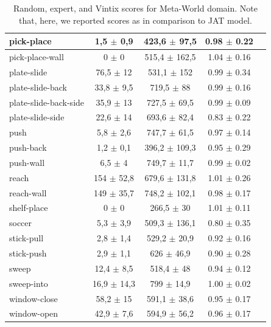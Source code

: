 \documentclass{article}
\theoremstyle{plain}
\theoremstyle{definition}
\theoremstyle{remark}
\begin{document}
\begin{table}[H]
{\begin{tabular}{|l|c|c|c|c|}
pick-place                & 1,5 $\pm$ 0,9     & 423,6 $\pm$ 97,5  &               0.98 $\pm$ 0.22     \\ \hline
pick-place-wall           & 0 $\pm$ 0         & 515,4 $\pm$ 162,5 &               1.04 $\pm$ 0.16     \\ \hline
plate-slide               & 76,5 $\pm$ 12     & 531,1 $\pm$ 152   &               0.99 $\pm$ 0.34     \\ \hline
plate-slide-back          & 33,8 $\pm$ 9,5    & 719,5 $\pm$ 88    &               0.99 $\pm$ 0.16     \\ \hline
plate-slide-back-side     & 35,9 $\pm$ 13     & 727,5 $\pm$ 69,5  &               0.99 $\pm$ 0.09     \\ \hline
plate-slide-side          & 22,6 $\pm$ 14     & 693,6 $\pm$ 82,4  &               0.83 $\pm$ 0.22     \\ \hline
push                      & 5,8 $\pm$ 2,6     & 747,7 $\pm$ 61,5  &               0.97 $\pm$ 0.14     \\ \hline
push-back                 & 1,2 $\pm$ 0,1     & 396,2 $\pm$ 109,3 &               0.95 $\pm$ 0.29     \\ \hline
push-wall                 & 6,5 $\pm$ 4       & 749,7 $\pm$ 11,7  &               0.99 $\pm$ 0.02     \\ \hline
reach                     & 154 $\pm$ 52,8    & 679,6 $\pm$ 131,8 &               1.01 $\pm$ 0.26     \\ \hline
reach-wall                & 149 $\pm$ 35,7    & 748,2 $\pm$ 102,1 &               0.98 $\pm$ 0.17     \\ \hline
shelf-place               & 0 $\pm$ 0         & 266,5 $\pm$ 30    &               1.01 $\pm$ 0.11     \\ \hline
soccer                    & 5,3 $\pm$ 3,9     & 509,3 $\pm$ 136,1 &               0.80 $\pm$ 0.35     \\ \hline
stick-pull                & 2,8 $\pm$ 1,4     & 529,2 $\pm$ 20,9  &               0.92 $\pm$ 0.16     \\ \hline
stick-push                & 2,9 $\pm$ 1,1     & 626 $\pm$ 46,9    &               0.90 $\pm$ 0.28     \\ \hline
sweep                     & 12,4 $\pm$ 8,5    & 518,4 $\pm$ 48    &               0.94 $\pm$ 0.12     \\ \hline
sweep-into                & 16,9 $\pm$ 14,3   & 799 $\pm$ 14,9    &               1.00 $\pm$ 0.02     \\ \hline
window-close              & 58,2 $\pm$ 15     & 591,1 $\pm$ 38,6  &               0.95 $\pm$ 0.17     \\ \hline
window-open               & 42,9 $\pm$ 7,6    & 594,9 $\pm$ 56,2  &               0.96 $\pm$ 0.17     \\ \hline
\end{tabular}}
\caption{Random, expert, and Vintix scores for Meta-World domain. Note that, here, we reported scores as in comparison to JAT model.}
\end{table}
\end{document}
